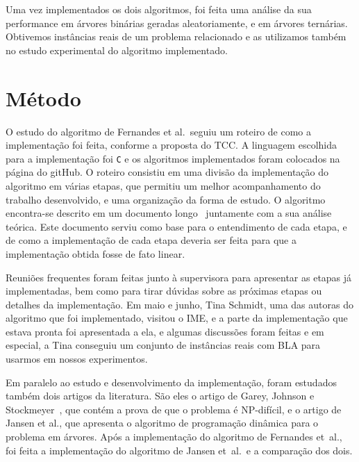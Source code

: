 \documentclass[a4paper,12pt]{article}
\begin{document}
Uma vez implementados os dois algoritmos, foi feita uma análise 
da sua performance em árvores binárias geradas aleatoriamente, e 
em árvores ternárias.
Obtivemos instâncias reais de um problema relacionado e as 
utilizamos também no estudo experimental do algoritmo implementado.
 

\newpage



\section{Método}

O estudo do algoritmo de Fernandes et al.\ seguiu um roteiro de
como a implementação foi feita, conforme a proposta do TCC. 
A linguagem escolhida para a implementação foi \texttt{C} e os 
algoritmos implementados foram colocados na página do gitHub. 
O roteiro consistiu em uma divisão da implementação do algoritmo 
em várias etapas, que permitiu um melhor acompanhamento do 
trabalho desenvolvido, e uma organização da forma de estudo. 
O algoritmo encontra-se descrito em um documento 
longo~\cite{Schmidt15} juntamente com a sua análise teórica. 
Este documento serviu como base para o entendimento de cada 
etapa, e de como a implementação de cada etapa deveria ser feita 
para que a implementação obtida fosse de fato linear. 

Reuniões frequentes foram feitas junto à supervisora para 
apresentar as etapas já implementadas, bem como para tirar dúvidas 
sobre as próximas etapas ou detalhes da implementação. 
Em maio e junho, Tina Schmidt, uma das autoras do algoritmo que 
foi implementado, visitou o IME, e a parte da 
implementação que estava pronta foi apresentada a ela, e 
algumas discussões foram feitas e em especial, a Tina conseguiu
um conjunto de instâncias reais com BLA para usarmos em nossos
experimentos.   

Em paralelo ao estudo e desenvolvimento da implementação, foram 
estudados também dois artigos da literatura. São eles o artigo 
de Garey, 
Johnson e Stockmeyer~\cite{GareyJS76}, que contém a prova de que o 
problema é NP-difícil, e o artigo de Jansen et al., que apresenta 
o algoritmo de programação dinâmica para o problema em árvores. 
Após a implementação do algoritmo de Fernandes et~al., foi feita 
a implementação do algoritmo de Jansen et~al.\ e a comparação dos 
dois. 
\end{document}
